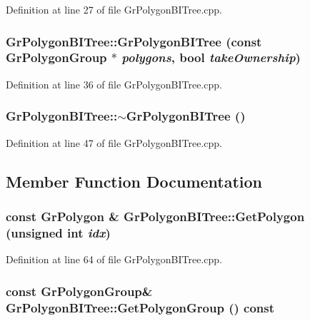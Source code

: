 Definition at line 27 of file GrPolygonBITree.cpp.\hypertarget{class_gr_polygon_b_i_tree_6c3fb73e6110c988c4b26a6e17fa4db6}{
\subsubsection[{GrPolygonBITree}]{\setlength{\rightskip}{0pt plus 5cm}GrPolygonBITree::GrPolygonBITree (const {\bf GrPolygonGroup} $\ast$ {\em polygons}, \/  bool {\em takeOwnership})}}
\label{class_gr_polygon_b_i_tree_6c3fb73e6110c988c4b26a6e17fa4db6}




Definition at line 36 of file GrPolygonBITree.cpp.\hypertarget{class_gr_polygon_b_i_tree_069fe42f81a14d4beb10c2e1b16bc5f4}{
\subsubsection[{$\sim$GrPolygonBITree}]{\setlength{\rightskip}{0pt plus 5cm}GrPolygonBITree::$\sim$GrPolygonBITree ()}}
\label{class_gr_polygon_b_i_tree_069fe42f81a14d4beb10c2e1b16bc5f4}




Definition at line 47 of file GrPolygonBITree.cpp.

\subsection{Member Function Documentation}
\hypertarget{class_gr_polygon_b_i_tree_6b74a3b2dd30c9220f0ed1d3a596e68c}{
\subsubsection[{GetPolygon}]{\setlength{\rightskip}{0pt plus 5cm}const {\bf GrPolygon} \& GrPolygonBITree::GetPolygon (unsigned int {\em idx})}}
\label{class_gr_polygon_b_i_tree_6b74a3b2dd30c9220f0ed1d3a596e68c}




Definition at line 64 of file GrPolygonBITree.cpp.\hypertarget{class_gr_polygon_b_i_tree_c3a04636c00a74f788587e60610cf5bf}{
\subsubsection[{GetPolygonGroup}]{\setlength{\rightskip}{0pt plus 5cm}const {\bf GrPolygonGroup}\& GrPolygonBITree::GetPolygonGroup () const}}
\label{class_gr_polygon_b_i_tree_c3a04636c00a74f788587e60610cf5bf}




